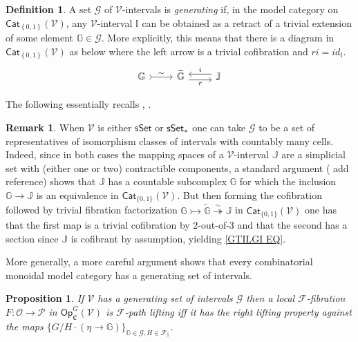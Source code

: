 \documentclass[a4paper,10pt
,draft
]{article}%
\numberwithin{equation}{section}
\numberwithin{figure}{section}
\newtheorem{proposition}[equation]{Proposition}%
\theoremstyle{definition} %
\newtheorem{definition}[equation]{Definition}%
\newtheorem{remark}[equation]{Remark}%
\newcommand{\set}[1]{\left\{#1\right\}}%
\newcommand{\Cat}{\mathsf{Cat}}
\newcommand{\F}{\ensuremath{\mathcal F}}
\newcommand{\V}{\ensuremath{\mathcal V}}
\renewcommand{\O}{\ensuremath{\mathcal O}}
\renewcommand{\P}{\ensuremath{\mathcal P}}
\newcommand{\1}{\ensuremath{\mathbbm 1}}%
\begin{document}
\begin{definition}
	A set $\mathscr{G}$ of $\V$-intervals is \textit{generating} if,
	in the model category on $\Cat_{\set{0,1}}(\V)$,
	any $\V$-interval $\mathbb{I}$ can be obtained
	as a retract of a trivial extension of some element
	$\mathbb{G} \in \mathscr{G}$.
	More explicitly, this means that there is a diagram in 
	$\Cat_{\set{0,1}}(\V)$ as below
	where the left arrow is a trivial cofibration and
	$ri = id_{\mathbb{I}}$.
\begin{equation}\label{GTILGI EQ}
	\begin{tikzcd}
		\mathbb{G} \arrow[r,rightarrowtail, "\sim"]
	&
		\widetilde{\mathbb{G}} \arrow[r,yshift=-.3em, "r"']
	&
		\mathbb{J} \arrow[l,yshift=.3em, "i"']
	\end{tikzcd}
\end{equation}
\end{definition}


The following essentially recalls \cite[1.20]{CM13b}, \cite[\S 4.3]{Cav}.


\begin{remark}
When $\V$ is either $\mathsf{sSet}$ or $\mathsf{sSet}_{\**}$
one can take $\mathscr{G}$ to be a set of representatives of isomorphism classes of intervals with countably many cells.
Indeed, since in both cases the mapping spaces of a $\V$-interval
$\mathbb{J}$ are a simplicial set with (either one or two) contractible components,
a standard argument ({\color{red} add reference})
shows that $\mathbb{J}$ has a countable subcomplex 
$\mathbb{G}$ for which the inclusion 
$\mathbb{G} \to \mathbb{J}$
is an equivalence in $\mathsf{Cat}_{\{0,1\}}(\V)$.
But then forming the cofibration followed by trivial fibration factorization
$\mathbb{G} \rightarrowtail \widetilde{\mathbb{G}}
\overset{\sim}{\twoheadrightarrow} \mathbb{J}$
in $\mathsf{Cat}_{\{0,1\}}(\V)$
one has that the first map is a trivial cofibration by $2$-out-of-$3$
and that the second has a section since $\mathbb{J}$ is cofibrant by assumption, yielding \eqref{GTILGI EQ}.

More generally, a more careful argument \cite[Lemma 1.12]{BM13}
shows that every combinatorial monoidal model category
has a generating set of intervals.
\end{remark}



\begin{proposition}\label{GENIN PROP}
If $\V$ has a generating set of intervals $\mathscr{G}$ then a local $\F$-fibration 
$F \colon \O \to \P$ in 
$\mathsf{Op}^G_{\mathfrak{C}}(\V)$
is $\F$-path lifting iff it has the right lifting property against the maps 
$\{G/H \cdot (\eta \to \mathbb{G})\}_{\mathbb{G}\in \mathscr{G},H \in \mathcal{F}_1}$.
\end{proposition}
\end{document}
